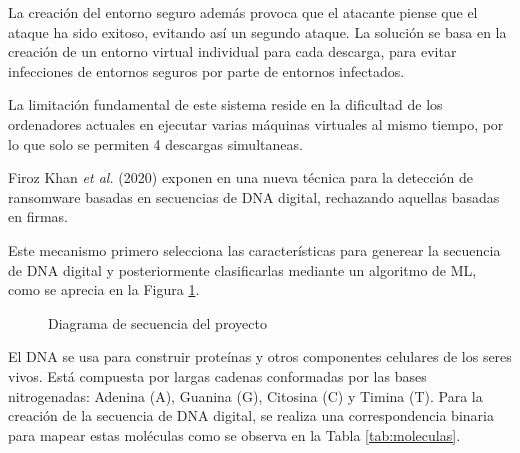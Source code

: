 La creación del entorno seguro además provoca que el atacante piense que el ataque ha sido exitoso, evitando así un segundo ataque. La solución se basa en la creación de un entorno virtual individual para cada descarga, para evitar infecciones de entornos seguros por parte de entornos infectados. 

La limitación fundamental de este sistema reside en la dificultad de los ordenadores actuales en ejecutar varias máquinas virtuales al mismo tiempo, por lo que solo se permiten 4 descargas simultaneas.


Firoz Khan \textit{et al.} (2020) exponen en \cite{9121260} una nueva técnica para la detección de ransomware basadas en secuencias de \gls{DNA} digital, rechazando aquellas basadas en firmas.

Este mecanismo primero selecciona las características para generear la secuencia de \gls{DNA} digital y posteriormente clasificarlas mediante un algoritmo de \gls{ML}, como se aprecia en la Figura \ref{fig:adn}. 
\begin{figure}[h!]
\begin{center}
{}
\end{center}
\caption{Diagrama de secuencia del proyecto}
\label{fig:adn}
\end{figure}
El \gls{DNA} se usa para construir proteínas y otros componentes celulares de los seres vivos. Está compuesta por largas cadenas conformadas por las bases nitrogenadas: Adenina (A), Guanina (G), Citosina (C) y Timina (T).  Para la creación de la secuencia de \gls{DNA} digital, se realiza una correspondencia binaria para mapear estas moléculas como se observa en la Tabla \ref{tab:moleculas}.



